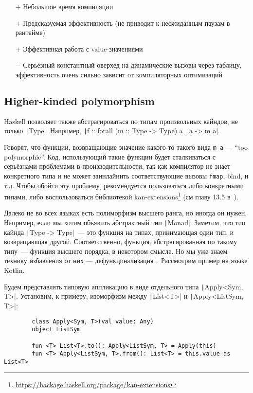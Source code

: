 \documentclass[12pt]{article}
\newcommand{\positive}{$+$} %
\newcommand{\negative}{{\color{red} $-$}} %
\begin{document}
    \begin{itemize}
        \item[\positive] Небольшое время компиляции
        \item[\positive] Предсказуемая эффективность (не приводит к неожиданным паузам в рантайме)
        \item[\positive] Эффективная работа с value-значениями
        \item[\negative] Серьёзный константный оверхед на динамические вызовы через таблицу, эффективность очень сильно зависит от компиляторных оптимизаций
    \end{itemize}


    \subsection{Higher-kinded polymorphism}

    Haskell позволяет также абстрагироваться по типам произвольных кайндов, не только \texttt|Type|.
    Например, \texttt|f :: forall (m :: Type -> Type) a . a -> m a|.

    Говорят, что функции, возвращающие значение какого-то такого вида \texttt{m a} --- ``too polymorphic''.
    Код, использующий такие функции будет сталкиваться с серьёзнами проблемами в производительности, так как компилятор не знает конкретного типа и не может заинлайнить соответствующие вызовы \texttt{fmap}, bind, и т.д.
    Чтобы обойти эту проблему, рекомендуется пользоваться либо конкретными типами, либо воспользоваться библиотекой kan-extensions\footnote{\url{https://hackage.haskell.org/package/kan-extensions}} (см главу 13.5 в~\cite{maguire-types}).


    Далеко не во всех языках есть полиморфизм высшего ранга, но иногда он нужен.
    Например, если мы хотим объявить абстрактный тип \texttt|Monad|.
    Заметим, что тип кайнда \texttt|Type -> Type|~--- это функция на типах, принимающая один тип, и возвращающая другой.
    Соответственно, функция, абстрагированная по такому типу~--- функция высшего порядка, в некотором смысле.
    Но мы уже знаем технику избавления от них --- дефункцинализация~\cite{defunctionalization-slides}.
    Рассмотрим пример на языке Kotlin.

    Будем представлять типовую аппликацию в виде отдельного типа \texttt|Apply<Sym, T>|.
    Установим, к примеру, изоморфизм между \texttt|List<T>| и \texttt|Apply<ListSym, T>|:
    \begin{verbatim}
        class Apply<Sym, T>(val value: Any)
        object ListSym

        fun <T> List<T>.to(): Apply<ListSym, T> = Apply(this)
        fun <T> Apply<ListSym, T>.from(): List<T> = this.value as List<T>
    \end{verbatim}
\end{document}
